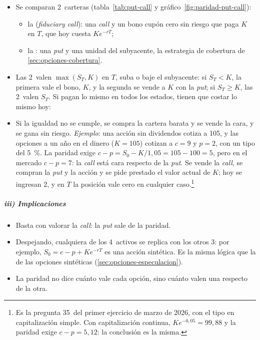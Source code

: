 \documentclass[11pt]{article}
\begin{document}
\begin{itemize}
\item Se comparan 2~carteras (tabla~\ref{tab:put-call} y gráfico~\ref{fig:paridad-put-call}):
  \begin{itemize}
  \item la  (\emph{fiduciary call}): una \emph{call} y un bono cupón cero sin riesgo que paga $K$ en $T$, que hoy cuesta $Ke^{-rT}$;
  \item la : una \emph{put} y una unidad del subyacente, la estrategia de cobertura de \ref{sec:opciones-cobertura}.
  \end{itemize}
\item Las 2~valen $\max(S_T,K)$ en $T$, suba o baje el subyacente: si $S_T<K$, la primera vale el bono, $K$, y la segunda se vende a $K$ con la \emph{put}; si $S_T\geq K$, las 2~valen $S_T$. Si pagan lo mismo en todos los estados, tienen que costar lo mismo hoy:
\item Si la igualdad no se cumple, se compra la cartera barata y se vende la cara, y se gana sin riesgo. \emph{Ejemplo}: una acción sin dividendos cotiza a 105, y las opciones a un año en el dinero ($K=105$) cotizan a $c=9$ y $p=2$, con un tipo del 5~\%. La paridad exige $c-p=S_0-K/1{,}05=105-100=5$, pero en el mercado $c-p=7$: la \emph{call} está cara respecto de la \emph{put}. Se vende la \emph{call}, se compran la \emph{put} y la acción y se pide prestado el valor actual de $K$; hoy se ingresan 2, y en $T$ la posición vale cero en cualquier caso.\footnote{Es la pregunta 35~del primer ejercicio de marzo de 2026, con el tipo en capitalización simple. Con capitalización continua, $Ke^{-0{,}05}=99{,}88$ y la paridad exige $c-p=5{,}12$: la conclusión es la misma.}
\end{itemize}

\subparagraph{iii) Implicaciones}

\begin{itemize}
\item Basta con valorar la \emph{call}: la \emph{put} sale de la paridad.
\item Despejando, cualquiera de los 4~activos se replica con los otros 3: por ejemplo, $S_0=c-p+Ke^{-rT}$ es una acción sintética. Es la misma lógica que la de las opciones sintéticas (\ref{sec:opciones-especulacion}).
\item La paridad no dice cuánto vale cada opción, sino cuánto valen una respecto de la otra.
\end{itemize}
\end{document}
